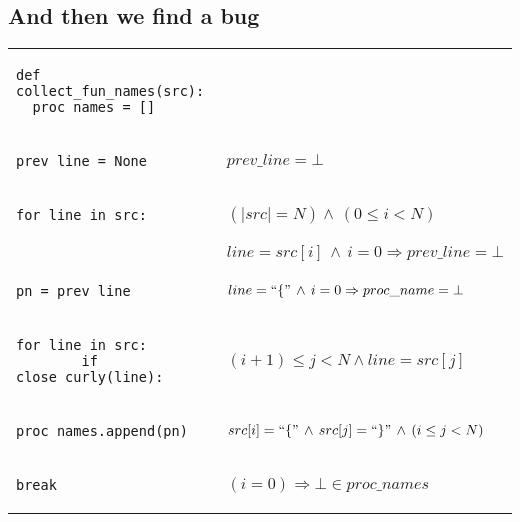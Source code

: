 \documentclass[10pt, a4paper]{article}
\begin{document}
\subsection{And then we find a bug}
\noindent\hspace*{-0.5em}\begin{tabular}{@{}ll@{}}
{\noindent\lstset{language=Python, basicstyle=\ttfamily\small, numbers=left}
\noindent\begin{lstlisting}
def collect_fun_names(src):
  proc_names = []
\end{lstlisting}}
&\\

{\noindent\lstset{language=Python, numbers=left, backgroundcolor=\color{lightgreen}}
\begin{lstlisting}[firstnumber=3]
  prev_line = None
\end{lstlisting}}
&$prev\_line = \bot$\\

{\noindent\lstset{numbers=left, backgroundcolor=\color{lightgreen}}
\noindent\begin{lstlisting}[firstnumber=last]
  for line in src:
\end{lstlisting}}
& $(|src| = N) \wedge\,(0 \le i < N) $\\

\noindent\lstset{backgroundcolor=\color{lightgreen}}
\noindent{\begin{lstlisting}[firstnumber=last]
    if open_curly(line):
\end{lstlisting}}
& $line = src[i]\,\wedge\,i = 0 \Rightarrow prev\_line = \bot$\\

\noindent\lstset{backgroundcolor=\color{lightgreen}}
{\begin{lstlisting}[firstnumber=last]
      pn = prev_line
\end{lstlisting}}
&$line = ``\{" \,\wedge\,i = 0 \Rightarrow proc\_name = \bot $\\

\lstset{backgroundcolor=\color{lightgreen}}
{\begin{lstlisting}[firstnumber=last]
      for line in src:
        if close_curly(line):
\end{lstlisting}}
& $(i+1) \le j < N \wedge line = src[j]$\\
\lstset{backgroundcolor=\color{lightgreen}}
{\begin{lstlisting}[firstnumber=last]
          proc_names.append(pn)
\end{lstlisting}}
&$src[i] = ``\{"\,\wedge\,src[j] = ``\}"\,\wedge\,(i \le j < N)$\\
\lstset{backgroundcolor=\color{lightgreen}}
{\begin{lstlisting}[firstnumber=last]
          break
\end{lstlisting}}
& $(i = 0) \Rightarrow \bot \in proc\_names $\\


\end{tabular}
\end{document}
